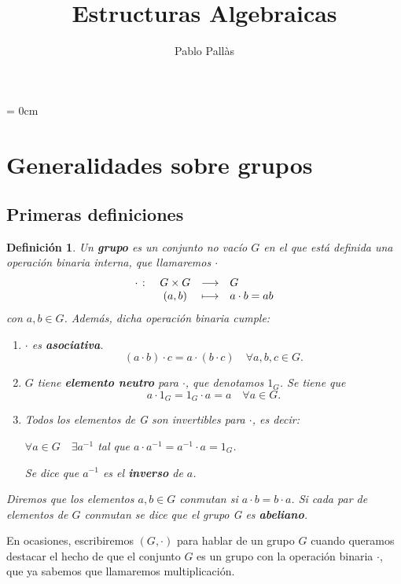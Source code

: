 \documentclass[12pt]{article}
\author{Pablo Pallàs}
\title{Estructuras Algebraicas}
\newtheorem{definition}[theorem]{Definición}
\begin{document}
\rmfamily
\maketitle
\tableofcontents
\parindent= 0cm
\section{Generalidades sobre grupos}
\subsection{Primeras definiciones}
\begin{definition}Un \textbf{grupo} es un conjunto no vacío $G$ en el que está definida una operación binaria interna, que llamaremos $\cdot$ $$\begin{array}{rccl}
\cdot\hspace{0.1cm} \colon &G \times G & \longrightarrow &G\\
&(a,b)& \longmapsto &a \cdot b =ab
\end{array}
$$ con $a,b \in G$. Además, dicha operación binaria cumple: 
\renewcommand{\labelenumi}{\roman {enumi}.}
\begin{enumerate}
\item $\cdot$ es \textbf{asociativa}. $$(a \cdot b)\cdot c = a \cdot(b \cdot c)\quad \forall a,b,c \in G.$$
\item $G$ tiene \textbf{elemento neutro} para $\cdot$, que denotamos $1_{G}$. Se tiene que $$a \cdot 1_{G} = 1_{G} \cdot a = a \quad \forall a \in G.$$
\item Todos los elementos de G son invertibles para $\cdot$, es decir:
\begin{center}
$\forall a \in G\quad\exists a^{-1}$ tal que $a \cdot a^{-1} = a^{-1} \cdot a = 1_{G}$.
\end{center}
Se dice que $a^{-1}$ es el \textbf{inverso} de $a$.
\end{enumerate}
Diremos que los elementos $a, b \in G$ conmutan si $a \cdot b = b \cdot a$. Si cada par de elementos de $G$ conmutan se dice que el grupo G es \textbf{abeliano}.
\end{definition}

En ocasiones, escribiremos $(G,\cdot)$ para hablar de un grupo $G$ cuando queramos destacar el hecho de que el conjunto $G$ es un grupo con la operación binaria $\cdot$, que ya sabemos que llamaremos multiplicación.
\end{document}
